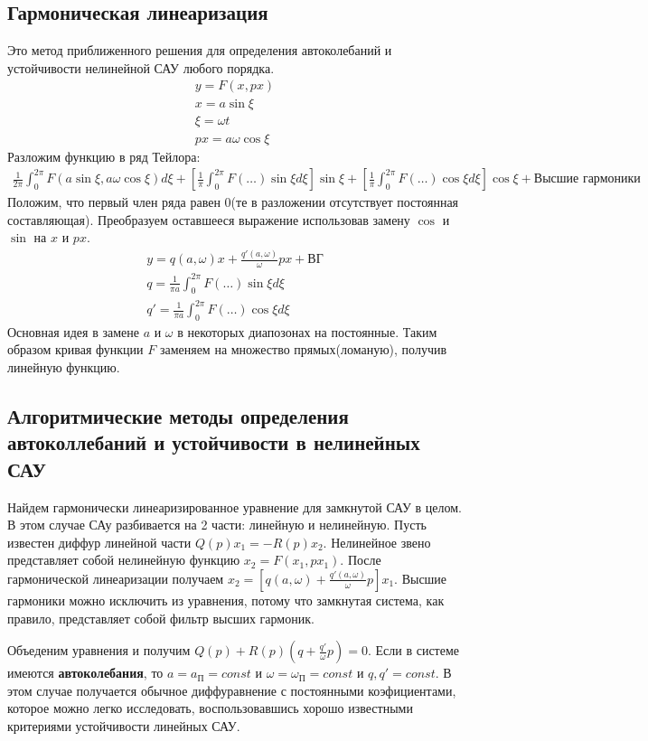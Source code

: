 \subsection{Гармоническая линеаризация}
Это метод приближенного решения для определения автоколебаний и устойчивости нелинейной САУ любого порядка.
\begin{align*}
	y = F(x, px) \\
	x = a\sin\xi \\ 
	\xi = \omega{}t\\
	px = a\omega\cos\xi
\end{align*}
Разложим функцию в ряд Тейлора:
\begin{align*}
	\frac1{2\pi}\int^{2\pi}_0F(a\sin\xi,a\omega\cos\xi)d\xi+[\frac1{\pi}\int^{2\pi}_0F(\ldots)\sin\xi{}d\xi]\sin\xi +[\frac1{\pi}\int^{2\pi}_0F(\ldots)\cos\xi{}d\xi]\cos\xi + \text{Высшие гармоники}
\end{align*}
Положим, что первый член ряда равен 0(те в разложении отсутствует постоянная составляющая). Преобразуем оставшееся выражение использовав замену $\cos$ и $\sin$ на $x$ и $px$.
\begin{align*}
	y=q(a,\omega)x+\frac{q'(a,\omega)}{\omega}px+ \text{ВГ} \\
	q=\frac1{\pi{}a}\int^{2\pi}_0F(\ldots)\sin\xi{}d\xi \\
	q'=\frac1{\pi{}a}\int^{2\pi}_0F(\ldots)\cos\xi{}d\xi
\end{align*}
Основная идея в замене $a$ и $\omega$ в некоторых диапозонах на постоянные. Таким образом кривая функции $F$ заменяем на множество прямых(ломаную), получив линейную функцию.

\subsection{Алгоритмические методы определения автоколлебаний и устойчивости в нелинейных САУ}
Найдем гармонически линеаризированное уравнение для замкнутой САУ в целом. В этом случае САу разбивается на 2 части: линейную и нелинейную. Пусть известен диффур линейной части $Q(p)x_1=-R(p)x_2$. Нелинейное звено представляет собой нелинейную функцию $x_2=F(x_1,px_1)$. После гармонической линеаризации получаем $x_2=[q(a,\omega)+\frac{q'(a,\omega)}{\omega}p]x_1$. Высшие гармоники можно исключить из уравнения, потому что замкнутая система, как правило, представляет собой фильтр высших гармоник.

Объеденим уравнения и получим $Q(p)+R(p)(q+\frac{q'}{\omega}p)=0$. Если в системе имеются \textbf{автоколебания}, то $a=a_{\text{П}}=const$ и $\omega=\omega_{\text{П}}=const$ и $q,q'=const$. В этом случае получается обычное диффуравнение с постоянными коэфициентами, которое можно легко исследовать, воспользовавшись хорошо известными критериями устойчивости линейных САУ.